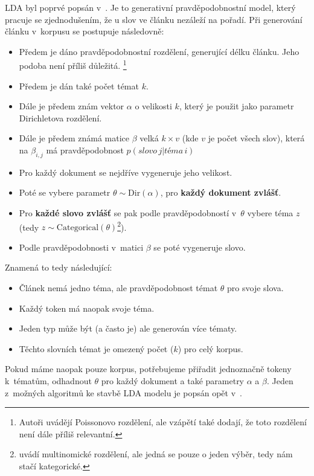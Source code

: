 \documentclass[12pt,a4paper]{report}
\begin{document}
LDA byl poprvé popsán v~\cite{lda}. Je to generativní pravděpodobnostní model, který pracuje se zjednodušením, že u slov ve článku nezáleží na pořadí. Při generování článku v~korpusu se postupuje následovně:

\begin{itemize}
    \item Předem je dáno pravděpodobnostní rozdělení, generující délku článku. Jeho podoba není příliš důležitá. \footnote{Autoři \cite{lda} uvádějí Poissonovo rozdělení, ale vzápětí také dodají, že toto rozdělení není dále příliš relevantní.}
    \item Předem je dán také počet témat $k$.
    \item Dále je předem znám vektor $\alpha$ o velikosti $k$, který je použit jako parametr Dirichletova rozdělení.
    \item Dále je předem známá matice $\beta$ velká $k \times v$ (kde $v$ je počet všech slov), která na $\beta_{i,j}$ má pravděpodobnost $p(slovo\,j|téma\,i)$
    \item Pro každý dokument se nejdříve vygeneruje jeho velikost.
    \item Poté se vybere parametr $\theta \sim \mathrm{Dir}\left(\alpha\right)$, pro \textbf{každý dokument zvlášť}.
    \item Pro \textbf{každé slovo zvlášť} se pak podle pravděpodobností v~$\theta$ vybere téma $z$ (tedy $z \sim \mathrm{Categorical}(\theta)$\footnote{\cite{lda} uvádí multinomické rozdělení, ale jedná se pouze o jeden výběr, tedy nám stačí kategorické.}).
    \item Podle pravděpodobnosti v~matici $\beta$ se poté vygeneruje slovo.
\end{itemize}

Znamená to tedy následující:
\begin{itemize}
    \item Článek nemá jedno téma, ale pravděpodobnost témat $\theta$ pro svoje slova.
    \item Každý token má naopak svoje téma.
    \item Jeden typ může být (a často je) ale generován více tématy.
    \item Těchto slovních témat je omezený počet ($k$) pro celý korpus.
\end{itemize}

Pokud máme naopak pouze korpus, potřebujeme přiřadit jednoznačně tokeny k~tématům, odhadnout $\theta$ pro každý dokument a také parametry $\alpha$ a $\beta$. Jeden z~možných algoritmů ke stavbě LDA modelu je popsán opět v~\cite{lda}.
\end{document}
